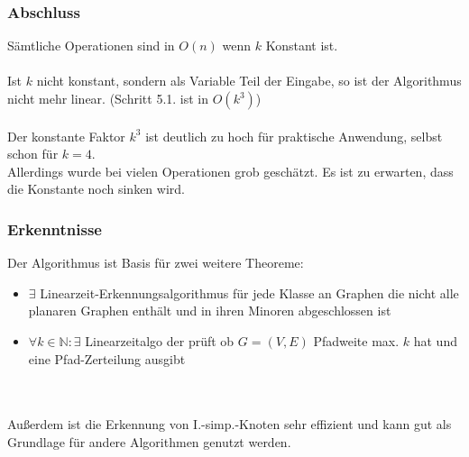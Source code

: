 \begin{frame}
\frametitle{Abschluss}
Sämtliche Operationen sind in $O(n)$ wenn $k$ Konstant ist. \\
\ \\
Ist $k$ nicht konstant, sondern als Variable Teil der Eingabe, so ist der Algorithmus nicht mehr linear. (Schritt 5.1. ist in $O(k^3)$) \\
\ \\
Der konstante Faktor $k^3$ ist deutlich zu hoch für praktische Anwendung, selbst schon für $k=4$. \\
Allerdings wurde bei vielen Operationen grob geschätzt. Es ist zu erwarten, dass die Konstante noch sinken wird. \\
\end{frame}




\begin{frame}
\frametitle{Erkenntnisse}
Der Algorithmus ist Basis für zwei weitere Theoreme: \\
\begin{itemize}
	\item $\exists$ Linearzeit-Erkennungsalgorithmus für jede Klasse an Graphen die nicht alle planaren Graphen enthält und in ihren Minoren abgeschlossen ist
	\item $\forall k \in \mathbb{N}: \exists$ Linearzeitalgo der prüft ob $G=(V,E)$ Pfadweite max. $k$ hat und eine Pfad-Zerteilung ausgibt
\end{itemize}
\ \\
\ \\
Außerdem ist die Erkennung von I.-simp.-Knoten sehr effizient und kann gut als Grundlage für andere Algorithmen genutzt werden.
\end{frame}